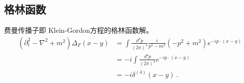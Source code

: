 \subsection{格林函数} 
费曼传播子即 Klein-Gordon方程的格林函数解。
\begin{equation}
\begin{aligned}
\left(\partial_{t}^{2}-\nabla^{2}+m^{2}\right) \Delta_{F}(x-y) &=\int \frac{d^{4} p}{(2 \pi)^{4}} \frac{i}{p^{2}-m^{2}}\left(-p^{2}+m^{2}\right) e^{-i p \cdot(x-y)} \\
&=-i \int \frac{d^{4} p}{(2 \pi)^{4}} e^{-i p \cdot(x-y)} \\
&=-i \delta^{(4)}(x-y)~.
\end{aligned}
\end{equation}
